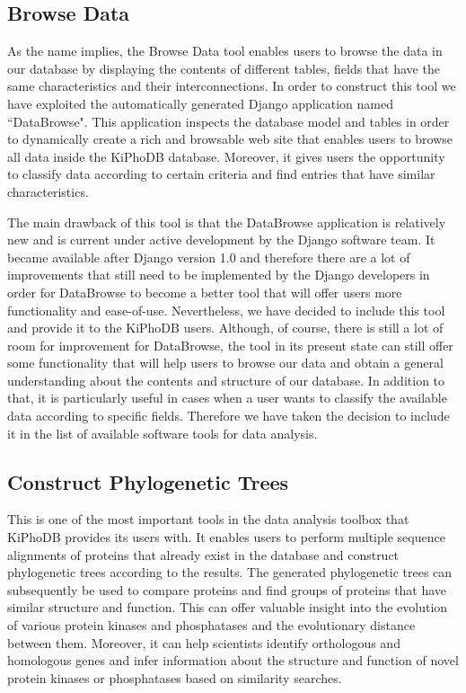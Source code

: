 \subsection{Browse Data}
As the name implies, the Browse Data tool enables users to browse the data in our database by displaying the contents of different tables, fields that have the same characteristics and their interconnections.
In order to construct this tool we have exploited the automatically generated Django application named ``DataBrowse".
This application inspects the database model and tables in order to dynamically create a rich and browsable web site that enables users to browse all data inside the KiPhoDB database.
Moreover, it gives users the opportunity to classify data according to certain criteria and find entries that have similar characteristics.

The main drawback of this tool is that the DataBrowse application is relatively new and is current under active development by the Django software team.
It became available after Django version 1.0 and therefore there are a lot of improvements that still need to be implemented by the Django developers in order for DataBrowse to become a better tool that will offer users more functionality and ease-of-use.
Nevertheless, we have decided to include this tool and provide it to the KiPhoDB users.
Although, of course, there is still a lot of room for improvement for DataBrowse, the tool in its present state can still offer some functionality that will help users to browse our data and obtain a general understanding about the contents and structure of our database.
In addition to that, it is particularly useful in cases when a user wants to classify the available data according to specific fields.
Therefore we have taken the decision to include it in the list of available software tools for data analysis.

\subsection{Construct Phylogenetic Trees}
This is one of the most important tools in the data analysis toolbox that KiPhoDB provides its users with.
It enables users to perform multiple sequence alignments of proteins that already exist in the database and construct phylogenetic trees according to the results.
The generated phylogenetic trees can subsequently be used to compare proteins and find groups of proteins that have similar structure and function.
This can offer valuable insight into the evolution of various protein kinases and phosphatases and the evolutionary distance between them.
Moreover, it can help scientists identify orthologous and homologous genes and infer information about the structure and function of novel protein kinases or phosphatases based on similarity searches.

